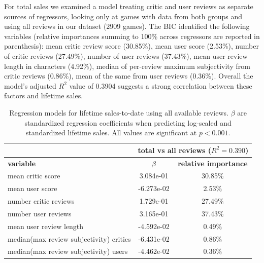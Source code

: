 \documentclass[letterpaper]{article}
\begin{document}
For total sales we examined a model treating critic and user reviews as separate sources of regressors, looking only at games with data from both groups and using all reviews in our dataset (2909 games). The BIC identified the following variables (relative importances summing to 100\% across regressors are reported in parenthesis): mean critic review score (30.85\%), mean user score (2.53\%), number of critic reviews (27.49\%), number of user reviews (37.43\%), mean user review length in characters (4.92\%), median of per-review maximum subjectivity from critic reviews (0.86\%), mean of the same from user reviews (0.36\%). Overall the model's adjusted $R^2$ value of 0.3904 suggests a strong correlation between these factors and lifetime sales.

\begin{table}[tb]
\centering
\scriptsize
\begin{tabularx}{\linewidth}{|X|c|c|}
\hline  & \multicolumn{2}{|c|}{\textbf{total vs all reviews} ($R^2 = 0.390$)}\\ 
\hline \textbf{variable} & \textbf{$\beta$} & \textbf{relative importance}\\ 
\hline mean critic score & 3.084e-01 & 30.85\%\\ 
\hline mean user score & -6.273e-02 & 2.53\%\\ 
\hline number critic reviews & 1.729e-01 & 27.49\%\\ 
\hline number user reviews & 3.165e-01 & 37.43\%\\ 
\hline mean user review length & -4.592e-02 & 0.49\%\\ 
\hline median(max review subjectivity) critics & -6.431e-02 & 0.86\%\\ 
\hline median(max review subjectivity) users & -4.462e-02 & 0.36\%\\ 
\hline 
\end{tabularx}
\label{tab:sales_totsale_lm}
\caption{Regression models for lifetime sales-to-date using all available reviews. $\beta$ are standardized regression coefficients when predicting log-scaled and standardized lifetime sales. All values are significant at $p < 0.001$.}
\end{table}
\end{document}
